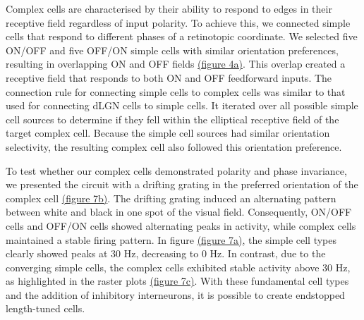 \documentclass[12pt]{article}
\begin{document}
Complex cells are characterised by their ability to respond to edges in their receptive field regardless of input polarity. To achieve this, we connected simple cells that respond to different phases of a retinotopic coordinate. We selected five ON/OFF and five OFF/ON simple cells with similar orientation preferences, resulting in overlapping ON and OFF fields \hyperref[fig:LIF_connectivity]{(figure 4a)}. This overlap created a receptive field that responds to both ON and OFF feedforward inputs. The connection rule for connecting simple cells to complex cells was similar to that used for connecting dLGN cells to simple cells. It iterated over all possible simple cell sources to determine if they fell within the elliptical receptive field of the target complex cell. Because the simple cell sources had similar orientation selectivity, the resulting complex cell also followed this orientation preference.

To test whether our complex cells demonstrated polarity and phase invariance, we presented the circuit with a drifting grating in the preferred orientation of the complex cell \hyperref[fig:polarity invariance]{(figure 7b)}. The drifting grating induced an alternating pattern between white and black in one spot of the visual field. Consequently, ON/OFF cells and OFF/ON cells showed alternating peaks in activity, while complex cells maintained a stable firing pattern. In figure \hyperref[fig:polarity invariance]{(figure 7a)}, the simple cell types clearly showed peaks at 30 Hz, decreasing to 0 Hz. In contrast, due to the converging simple cells, the complex cells exhibited stable activity above 30 Hz, as highlighted in the raster plots \hyperref[fig:polarity invariance]{(figure 7c)}. With these fundamental cell types and the addition of inhibitory interneurons, it is possible to create endstopped length-tuned cells.



\end{document}
